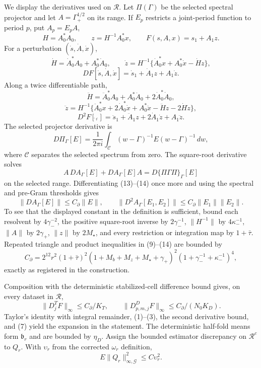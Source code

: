 We display the derivatives used on \(\mathcal R\). Let \(\Pi(\Gamma)\) be the selected spectral projector and let \(A=\Gamma_+^{1/2}\) on its range. If \(E_p\) restricts a joint-period function to period \(p\), put \(A_p=E_pA\),
\[
 H=A_0^*A_0,\qquad z=H^{-1}A_0^*x,\qquad
 F(s,A,x)=s_1+A_1z.                                      \tag{8}
\]
For a perturbation \((\dot s,\dot A,\dot x)\),
\[
 \dot H=\dot A_0^*A_0+A_0^*\dot A_0,
 \qquad
 \dot z=H^{-1}\{\dot A_0^*x+A_0^*\dot x-\dot Hz\},    \tag{9}
\]
\[
 DF[\dot s,\dot A,\dot x]
 =\dot s_1+\dot A_1z+A_1\dot z.                         \tag{10}
\]
Along a twice differentiable path,
\[
 \ddot H=\ddot A_0^*A_0+A_0^*\ddot A_0+2\dot A_0^*\dot A_0,
\]
\[
 \ddot z=H^{-1}\{\ddot A_0^*x+2\dot A_0^*\dot x
 +A_0^*\ddot x-\ddot Hz-2\dot H\dot z\},              \tag{11}
\]
\[
 D^2F[\dot{},\dot{}]
 =\ddot s_1+\ddot A_1z+2\dot A_1\dot z+A_1\ddot z.    \tag{12}
\]
The selected projector derivative is
\[
 D\Pi_\Gamma[E]
 =\frac1{2\pi i}\int_{\mathscr C}
 (w-\Gamma)^{-1}E(w-\Gamma)^{-1}\,dw,                  \tag{13}
\]
where \(\mathscr C\) separates the selected spectrum from zero. The square-root derivative solves
\[
 A\,DA_\Gamma[E]+DA_\Gamma[E]A
 =D\{\Pi\Gamma\Pi\}_\Gamma[E]                         \tag{14}
\]
on the selected range. Differentiating (13)--(14) once more and using the spectral and pre-Gram thresholds gives
\[
 \|DA_\Gamma[E]\|\le C_\partial\|E\|,
 \qquad
 \|D^2A_\Gamma[E_1,E_2]\|
 \le C_\partial\|E_1\|\|E_2\|.                       \tag{15}
\]
To see that the displayed constant in the definition is sufficient, bound each resolvent by \(4\gamma_-^{-2}\), the positive square-root inverse by \(2\gamma_-^{-1}\), \(\|H^{-1}\|\) by \(4\kappa_-^{-1}\), \(\|A\|\) by \(2\gamma_+\), \(\|z\|\) by \(2M_\star\), and every restriction or integration map by \(1+\bar\tau\). Repeated triangle and product inequalities in (9)--(14) are bounded by
\[
 C_\partial=2^{12}r^2(1+\bar\tau)^2
 (1+M_b+M_z+M_\star+\gamma_+)^2
 (1+\gamma_-^{-1}+\kappa_-^{-1})^4,                    \tag{16}
\]
exactly as registered in the construction.

Composition with the deterministic stabilized-cell difference bound gives, on every dataset in \(\mathcal R\),
\[
 \|D_j^TF\|_\infty\le C_\partial/K_T,
 \qquad
 \|D_{p,m,j}^DF\|_\infty\le C_\partial/(N_0K_D).       \tag{17}
\]
Taylor's identity with integral remainder, (1)--(3), the second derivative bound, and (7) yield the expansion in the statement. The deterministic half-fold means form \(\mathfrak b_r\) and are bounded by \(\eta_D\). Assign the bounded estimator discrepancy on \(\mathcal R^c\) to \(Q_r\). With \(\upsilon_r\) from the corrected \(\omega_r\) definition,
\[
 E\|Q_r\|_{\infty,\mathcal G}^2\le C\upsilon_r^2.      \tag{18}
\]

